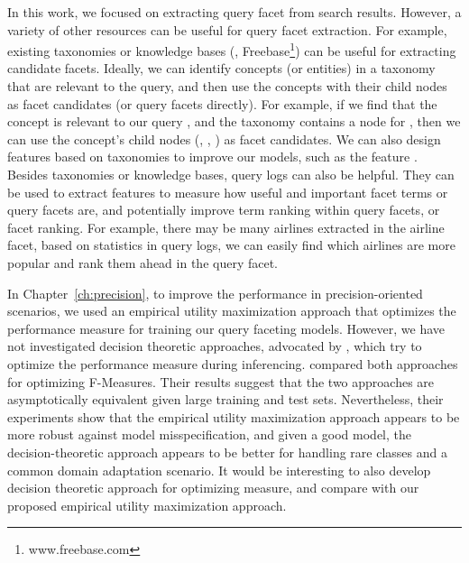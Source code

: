 In this work, we focused on extracting query facet from search results. However, a variety of other resources can be useful for query facet extraction. For example, existing taxonomies or knowledge bases (\eg, Freebase\footnote{www.freebase.com}) can be useful for extracting candidate facets. Ideally, we can identify concepts (or entities) in a taxonomy that are relevant to the query, and then use the concepts with their child nodes as facet candidates (or query facets directly). For example, if we find that the concept  is relevant to our query , and the taxonomy contains a node for , then we can use the concept's child nodes (, , ) as facet candidates. We can also design features based on taxonomies to improve our models, such as the feature . Besides taxonomies or knowledge bases, query logs can also be helpful. They can be used 
to extract 
features to measure how useful and important facet terms or query facets are, and potentially improve term ranking within query facets, or facet ranking. For example, there may be many airlines extracted in the airline facet, based on statistics in query logs, we can easily find which airlines are more popular and rank them ahead in the query facet.

In Chapter~\ref{ch:precision}, to improve the performance in precision-oriented scenarios, we used an empirical utility maximization approach that optimizes the performance measure for training our query faceting models. However, we have not investigated  decision theoretic approaches, advocated by \citet{lewis1995evaluating}, which try to optimize the performance measure during inferencing. \citet{nan2012optimizing} compared both approaches for optimizing F-Measures. Their results suggest that the two approaches are asymptotically equivalent given large training and test sets. Nevertheless, their experiments show that the empirical utility maximization approach appears to be more robust against model misspecification, and given a good model, the decision-theoretic approach appears to be better for handling rare classes and a common domain adaptation scenario. It would be interesting to also develop decision theoretic approach for optimizing \PRF measure, and compare with our proposed empirical utility 
maximization 
approach.


